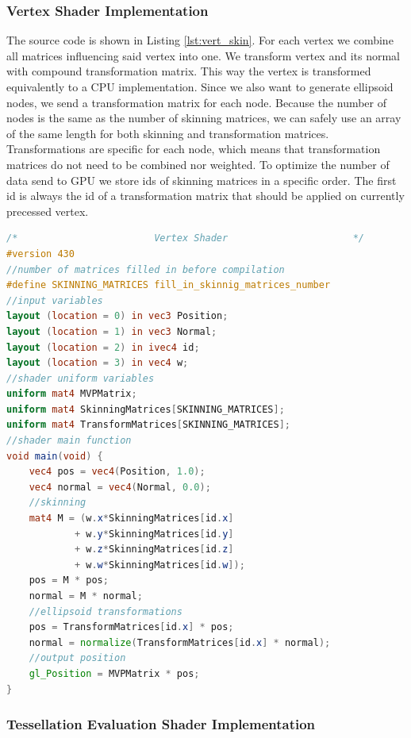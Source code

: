 \subsubsection{Vertex Shader Implementation}

The source code is shown in Listing \ref{lst:vert_skin}.
For each vertex we combine all matrices influencing said vertex into one.
We transform vertex and its normal with compound transformation matrix.
This way the vertex is transformed equivalently to a CPU implementation.
Since we also want to generate ellipsoid nodes, we send a transformation matrix for each node.
Because the number of nodes is the same as the number of skinning matrices, we can safely use an array of the same length for both skinning and transformation matrices.
Transformations are specific for each node, which means that transformation matrices do not need to be combined nor weighted.
To optimize the number of data send to GPU we store ids of skinning matrices in a specific order.
The first id is always the id of a transformation matrix that should be applied on currently precessed vertex.

\linespread{1.2}
\begin{lstlisting}[language=GLSL,caption={Linear Blend Skinning implemented in vertex shader},label={lst:vert_skin}]
/*                        Vertex Shader                      */ 
#version 430
//number of matrices filled in before compilation
#define SKINNING_MATRICES fill_in_skinnig_matrices_number
//input variables
layout (location = 0) in vec3 Position;
layout (location = 1) in vec3 Normal;
layout (location = 2) in ivec4 id;
layout (location = 3) in vec4 w;
//shader uniform variables
uniform mat4 MVPMatrix;
uniform mat4 SkinningMatrices[SKINNING_MATRICES];
uniform mat4 TransformMatrices[SKINNING_MATRICES];
//shader main function
void main(void) {
	vec4 pos = vec4(Position, 1.0);
	vec4 normal = vec4(Normal, 0.0);
	//skinning
	mat4 M = (w.x*SkinningMatrices[id.x]
			+ w.y*SkinningMatrices[id.y] 
			+ w.z*SkinningMatrices[id.z] 
			+ w.w*SkinningMatrices[id.w]);
	pos = M * pos;
	normal = M * normal;
	//ellipsoid transformations
	pos = TransformMatrices[id.x] * pos;
	normal = normalize(TransformMatrices[id.x] * normal);
	//output position
	gl_Position = MVPMatrix * pos;
}
\end{lstlisting} 
\linespread{1.5}

\subsubsection{Tessellation Evaluation Shader Implementation}

